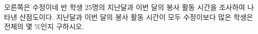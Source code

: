 \noindent\begin{minipage}[t]{0.58\linewidth}\vspace{0pt}\raggedright 오른쪽은 수정이네 반 학생 $25$명의 지난달과 이번 달의 봉사 활동 시간을 조사하여 나타낸 산점도이다. 지난달과 이번 달의 봉사 활동 시간이 모두 수정이보다 많은 학생은 전체의 몇 $\%$인지 구하시오.\end{minipage}\hfill\begin{minipage}[t]{0.4\linewidth}\vspace{0pt}\centering \resizebox{\ifdim\width>\linewidth\linewidth\else\width\fi}{!}{}\end{minipage}\par
